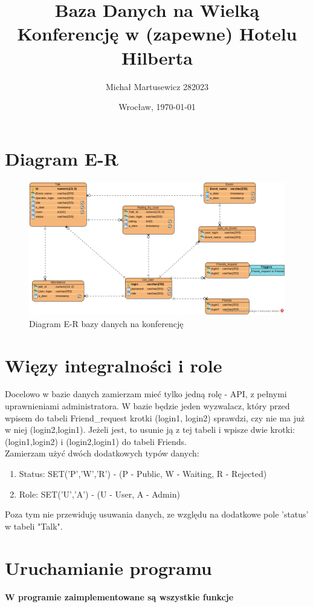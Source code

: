 \documentclass{article}
\author{Michał Martusewicz 282023}
\date{Wrocław, \today}
\title{\textbf{Baza Danych na Wielką Konferencję w (zapewne) Hotelu Hilberta}}
\begin{document}
\maketitle
\section{Diagram E-R}
\begin{figure}[H]
    \centering
	\includegraphics[width= 1 \textwidth]{Konferencja.png}
    \caption{Diagram E-R bazy danych na konferencję}
 	\label{diagram}
\end{figure}
\section{Więzy integralności i role}
Docelowo w bazie danych zamierzam mieć tylko jedną rolę - API, z pełnymi uprawnieniami administratora.
W bazie będzie jeden wyzwalacz, który przed wpisem do tabeli Friend\_request krotki (login1, login2) sprawdzi, czy nie ma już w niej (login2,login1). Jeżeli jest, to usunie ją z tej tabeli i wpisze dwie krotki: (login1,login2) i (login2,login1) do tabeli Friends.\\
Zamierzam użyć dwóch dodatkowych typów danych:
\begin{enumerate}
\item Status: SET('P','W','R') - (P - Public, W - Waiting, R - Rejected)
\item Role: SET('U','A') - (U -  User, A - Admin)
\end{enumerate}
Poza tym nie przewiduję usuwania danych, ze względu na dodatkowe pole 'status' w tabeli "Talk".

\section{Uruchamianie programu}
\textbf{W programie zaimplementowane są wszystkie funkcje}\\
\end{document}
